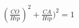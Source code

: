 \documentclass[preview]{standalone}
\begin{document}
\begin{align*}
(\frac{CO}{Hip})^2+\frac{CA}{Hip})^2=1
\end{align*}
\end{document}
